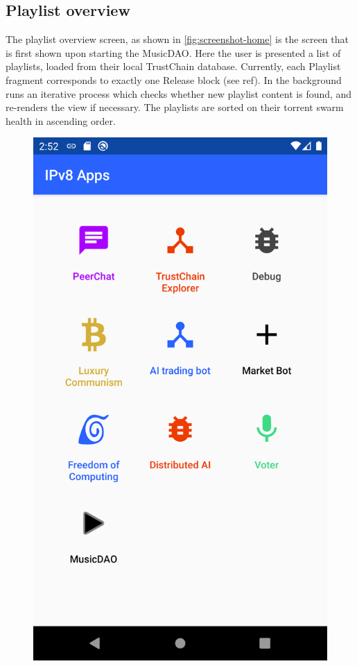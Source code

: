 \subsection{Playlist overview}
The playlist overview screen, as shown in \ref{fig:screenshot-home} is the screen that is first shown upon starting the MusicDAO. Here the user is presented a list of playlists, loaded from their local TrustChain database. Currently, each Playlist fragment corresponds to exactly one Release block (see ref). In the background runs an iterative process which checks whether new playlist content is found, and re-renders the view if necessary. The playlists are sorted on their torrent swarm health in ascending order. 
\begin{figure}
        \includegraphics[width=1\linewidth]{implementation/screenshot-superapp.png}

\end{figure}
